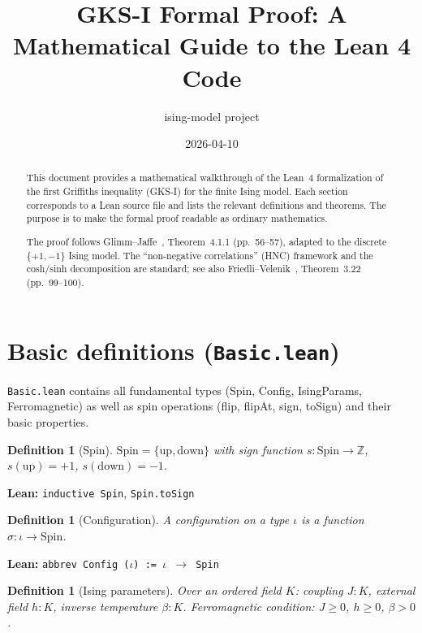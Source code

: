 \documentclass[a4paper,11pt]{article}
\title{GKS-I Formal Proof: A Mathematical Guide to the Lean 4 Code}
\author{ising-model project}
\date{2026-04-10}
\newtheorem{definition}[theorem]{Definition}
\begin{document}
\maketitle

\begin{abstract}
This document provides a mathematical walkthrough of the Lean~4
formalization of the first Griffiths inequality (GKS-I) for
the finite Ising model. Each section corresponds to a Lean source file
and lists the relevant definitions and theorems. The purpose is to
make the formal proof readable as ordinary mathematics.

The proof follows Glimm--Jaffe~\cite{glimm-jaffe}, Theorem~4.1.1
(pp.~56--57), adapted to the discrete $\{+1,-1\}$ Ising model.
The ``non-negative correlations'' (HNC) framework and the cosh/sinh
decomposition are standard; see also
Friedli--Velenik~\cite{friedli-velenik}, Theorem~3.22 (pp.~99--100).
\end{abstract}

\tableofcontents

\section{Basic definitions (\texttt{Basic.lean})}

\texttt{Basic.lean} contains all fundamental types (Spin, Config,
IsingParams, Ferromagnetic) as well as spin operations (flip,
flipAt, sign, toSign) and their basic properties.

\begin{definition}[Spin]
$\mathrm{Spin} = \{\mathrm{up}, \mathrm{down}\}$ with sign function
$s : \mathrm{Spin} \to \mathbb{Z}$, $s(\mathrm{up})=+1$,
$s(\mathrm{down})=-1$.
\end{definition}

\noindent\textbf{Lean:} \texttt{inductive Spin}, \texttt{Spin.toSign}

\begin{definition}[Configuration]
A configuration on a type $\iota$ is a function
$\sigma : \iota \to \mathrm{Spin}$.
\end{definition}

\noindent\textbf{Lean:} \texttt{abbrev Config ($\iota$) := $\iota$ $\to$ Spin}

\begin{definition}[Ising parameters]
Over an ordered field $K$: coupling $J : K$, external field $h : K$,
inverse temperature $\beta : K$.
Ferromagnetic condition: $J \geq 0$, $h \geq 0$, $\beta > 0$.
\end{definition}
\end{document}
